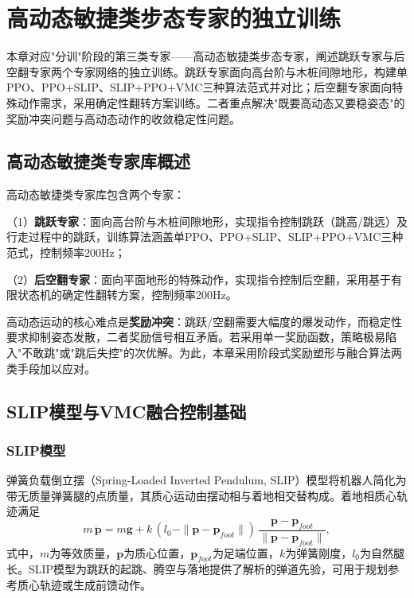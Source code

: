 
\chapter[高动态敏捷类步态专家的独立训练]{高动态敏捷类步态专家的独立训练}
\label{cha:agile-experts}

本章对应"分训"阶段的第三类专家——高动态敏捷类步态专家，阐述跳跃专家与后空翻专家两个专家网络的独立训练。跳跃专家面向高台阶与木桩间隙地形，构建单PPO、PPO+SLIP、SLIP+PPO+VMC三种算法范式并对比；后空翻专家面向特殊动作需求，采用确定性翻转方案训练。二者重点解决"既要高动态又要稳姿态"的奖励冲突问题与高动态动作的收敛稳定性问题。

\section{高动态敏捷类专家库概述}

高动态敏捷类专家库包含两个专家：

（1）\textbf{跳跃专家}：面向高台阶与木桩间隙地形，实现指令控制跳跃（跳高/跳远）及行走过程中的跳跃，训练算法涵盖单PPO、PPO+SLIP、SLIP+PPO+VMC三种范式，控制频率200Hz；

（2）\textbf{后空翻专家}：面向平面地形的特殊动作，实现指令控制后空翻，采用基于有限状态机的确定性翻转方案，控制频率200Hz。

高动态运动的核心难点是\textbf{奖励冲突}：跳跃/空翻需要大幅度的爆发动作，而稳定性要求抑制姿态发散，二者奖励信号相互矛盾。若采用单一奖励函数，策略极易陷入"不敢跳"或"跳后失控"的次优解。为此，本章采用阶段式奖励塑形与融合算法两类手段加以应对。

\section{SLIP模型与VMC融合控制基础}

\subsection{SLIP模型}

弹簧负载倒立摆（Spring-Loaded Inverted Pendulum, SLIP）模型将机器人简化为带无质量弹簧腿的点质量，其质心运动由摆动相与着地相交替构成\cite{blickhan1989,geyer2006}。着地相质心轨迹满足
\begin{equation}
  m\,\ddot{\boldsymbol{p}} = m\boldsymbol{g} + k\,(l_0 - \|\boldsymbol{p} - \boldsymbol{p}_{foot}\|)\,\frac{\boldsymbol{p} - \boldsymbol{p}_{foot}}{\|\boldsymbol{p} - \boldsymbol{p}_{foot}\|},
  \label{eq:slip}
\end{equation}
式中，$m$为等效质量，$\boldsymbol{p}$为质心位置，$\boldsymbol{p}_{foot}$为足端位置，$k$为弹簧刚度，$l_0$为自然腿长。SLIP模型为跳跃的起跳、腾空与落地提供了解析的弹道先验，可用于规划参考质心轨迹或生成前馈动作。

